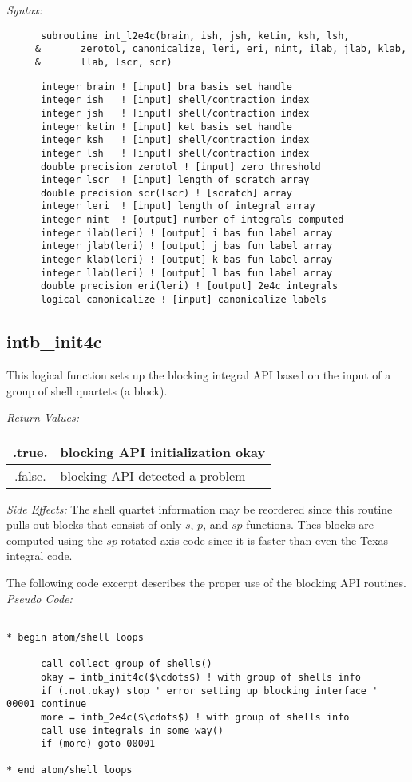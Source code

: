 {\it Syntax:} 
\begin{verbatim} 
      subroutine int_l2e4c(brain, ish, jsh, ketin, ksh, lsh, 
     &       zerotol, canonicalize, leri, eri, nint, ilab, jlab, klab, 
     &       llab, lscr, scr) 
\end{verbatim} 
\begin{verbatim} 
      integer brain ! [input] bra basis set handle 
      integer ish   ! [input] shell/contraction index 
      integer jsh   ! [input] shell/contraction index 
      integer ketin ! [input] ket basis set handle 
      integer ksh   ! [input] shell/contraction index 
      integer lsh   ! [input] shell/contraction index 
      double precision zerotol ! [input] zero threshold 
      integer lscr  ! [input] length of scratch array 
      double precision scr(lscr) ! [scratch] array 
      integer leri  ! [input] length of integral array 
      integer nint  ! [output] number of integrals computed 
      integer ilab(leri) ! [output] i bas fun label array  
      integer jlab(leri) ! [output] j bas fun label array  
      integer klab(leri) ! [output] k bas fun label array  
      integer llab(leri) ! [output] l bas fun label array  
      double precision eri(leri) ! [output] 2e4c integrals 
      logical canonicalize ! [input] canonicalize labels 
\end{verbatim} 
\subsection{intb\_init4c} 
This logical function sets up the blocking integral API based on the 
input of a group of shell quartets (a block).   
 
{\it Return Values:} 
\begin{tabular}{|c|p{60mm}|} \hline 
 .true.  & blocking API initialization okay\\ \hline 
 .false. & blocking API detected a problem \\ \hline 
\end{tabular} 
 
{\it Side Effects:}  The shell quartet information may be reordered 
since this routine pulls out blocks that consist of only $s$, $p$,  
and $sp$ functions.  Thes blocks are computed using the $sp$ rotated 
axis code since it is faster than even the Texas integral code. 
 
The following code excerpt describes the proper use of the blocking 
API routines.\\ 
{\it Pseudo Code:} 
\begin{verbatim} 
 
* begin atom/shell loops 
 
      call collect_group_of_shells() 
      okay = intb_init4c($\cdots$) ! with group of shells info      
      if (.not.okay) stop ' error setting up blocking interface ' 
00001 continue 
      more = intb_2e4c($\cdots$) ! with group of shells info 
      call use_integrals_in_some_way() 
      if (more) goto 00001 
 
* end atom/shell loops 
 
\end{verbatim} 
 
